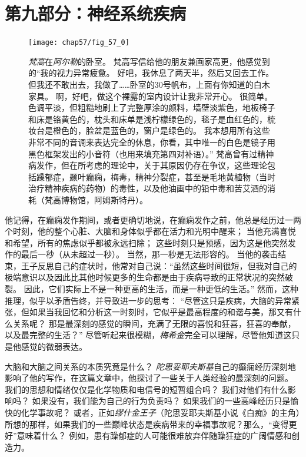 \chapter*{第九部分：神经系统疾病}

\begin{figure}[htbp]
	\centering
	\texttt{[image: chap57/fig\_57\_0]}
	\caption{\textit{梵高}在\textit{阿尔勒}的卧室。
		梵高写信给他的朋友兼画家高更，他感觉到的“我的视力异常疲惫。
		好吧，我休息了两天半，然后又回去工作。
		但我还不敢出去，我做了……卧室的30号帆布，上面有你知道的白木家具。
		啊，好吧，做这个裸露的室内设计让我非常开心。
		很简单。
		色调平淡，但粗糙地刷上了完整厚涂的颜料，墙壁淡紫色，地板椅子和床是铬黄色的，枕头和床单是浅柠檬绿色的，毯子是血红色的，梳妆台是橙色的，脸盆是蓝色的，窗户是绿色的。
		我本想用所有这些非常不同的音调来表达完全的休息，你看，其中唯一的白色是镜子用黑色框架发出的小音符（也用来填充第四对补语）。”
		梵高曾有过精神病发作，但在所考虑的理论中，关于其原因仍存在争议，这些理论包括躁郁症，颞叶癫痫，梅毒，精神分裂症，甚至是毛地黄植物（当时治疗精神疾病的药物）的毒性，以及他油画中的铅中毒和苦艾酒的消耗（梵高博物馆，阿姆斯特丹）。}
	\label{fig:59_0}
\end{figure}


他记得，在癫痫发作期间，或者更确切地说，在癫痫发作之前，他总是经历过一两个时刻，他的整个心脏、大脑和身体似乎都在活力和光明中醒来；
当他充满喜悦和希望，所有的焦虑似乎都被永远扫除；
这些时刻只是预感，因为这是他突然发作的最后一秒（从未超过一秒）。
当然，那一秒是无法形容的。
当他的袭击结束，王子反思自己的症状时，他常对自己说：“虽然这些时间很短，但我对自己的极端意识以及因此比其他时候更多的生命都是由于疾病导致的正常状况的突然破裂。
因此，它们实际上不是一种更高的生活，而是一种更低的生活。”
然而，这种推理，似乎以矛盾告终，并导致进一步的思考：
“尽管这只是疾病，大脑的异常紧张，但如果当我回忆和分析这一时刻时，它似乎是最高程度的和谐与美，那又有什么关系呢？
那是最深刻的感觉的瞬间，充满了无限的喜悦和狂喜，狂喜的奉献，以及最完整的生活？”
尽管听起来很模糊，\textit{梅希金}完全可以理解，尽管他知道这只是他感觉的微弱表达。


大脑和大脑之间关系的本质究竟是什么？
\textit{陀思妥耶夫斯基}自己的癫痫经历深刻地影响了他的写作，在这篇文章中，他探讨了一些关于人类经验的最深刻的问题。
我们的思想和情绪仅仅是化学物质和电信号的短暂组合吗？
我们对他们有什么影响吗？
如果没有，我们能为自己的行为负责吗？
如果我们的一些高峰经历只是愉快的化学事故呢？
或者，正如\textit{缪什金王子}（陀思妥耶夫斯基小说《白痴》的主角）所想的那样，如果我们的一些巅峰状态是疾病带来的幸福事故呢？那么，“变得更好”意味着什么？
例如，患有躁郁症的人可能很难放弃伴随躁狂症的广阔情感和创造力。


